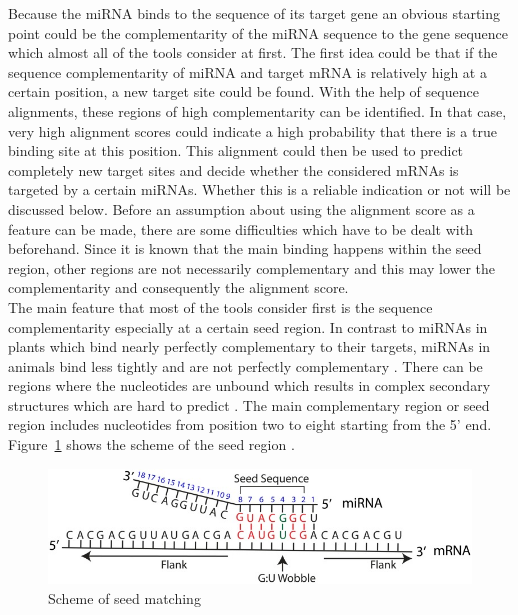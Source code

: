 \documentclass[11pt, a4paper, twoside]{book}
\begin{document}
Because the miRNA binds to the sequence of its target gene an obvious starting point could be the complementarity of the miRNA sequence to the gene sequence which almost all of the tools consider at first. The first idea could be that if the sequence complementarity of miRNA and target mRNA is relatively high at a certain position, a new target site could be found. With the help of sequence alignments, these regions of high complementarity can be identified. In that case, very high alignment scores could indicate a high probability that there is a true binding site at this position. This alignment could then be used to predict completely new target sites and decide whether the considered mRNAs is targeted by a certain miRNAs. Whether this is a reliable indication or not will be discussed below. Before an assumption about using the alignment score as a feature can be made, there are some difficulties which have to be dealt with beforehand. Since it is known that the main binding happens within the seed region, other regions are not necessarily complementary and this may lower the complementarity and consequently the alignment score. \\

The main feature that most of the tools consider first is the sequence complementarity especially at a certain seed region. In contrast to miRNAs in plants which bind nearly perfectly complementary to their targets, miRNAs in animals bind less tightly and are not perfectly complementary \cite{Rhoades}. There can be regions where the nucleotides are unbound which results in complex secondary structures which are hard to predict \cite{Rehmsmeier}. The main complementary region or seed region includes nucleotides from position two to eight starting from the 5' end. Figure~\ref{seed} shows the scheme of the seed region \cite{Peterson}. \\


\begin{figure}[h]
\centering
\includegraphics[scale=2.8]{results/seedmatching.png} 
\caption{Scheme of seed matching}
\label{seed}
\end{figure}
\end{document}
